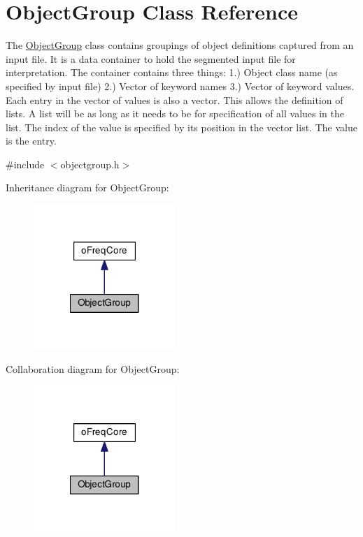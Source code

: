 \hypertarget{class_object_group}{\section{Object\-Group Class Reference}
\label{class_object_group}
}


The \hyperlink{class_object_group}{Object\-Group} class contains groupings of object definitions captured from an input file. It is a data container to hold the segmented input file for interpretation. The container contains three things\-: 1.) Object class name (as specified by input file) 2.) Vector of keyword names 3.) Vector of keyword values. Each entry in the vector of values is also a vector. This allows the definition of lists. A list will be as long as it needs to be for specification of all values in the list. The index of the value is specified by its position in the vector list. The value is the entry.  




{\ttfamily \#include $<$objectgroup.\-h$>$}



Inheritance diagram for Object\-Group\-:\nopagebreak
\begin{figure}[H]
\begin{center}
\leavevmode
\includegraphics[width=152pt]{class_object_group__inherit__graph}
\end{center}
\end{figure}


Collaboration diagram for Object\-Group\-:\nopagebreak
\begin{figure}[H]
\begin{center}
\leavevmode
\includegraphics[width=152pt]{class_object_group__coll__graph}
\end{center}
\end{figure}

